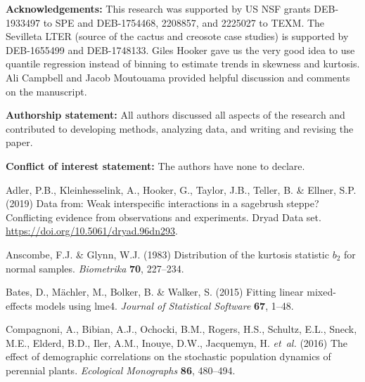 \documentclass[12pt]{article}
\begin{document}
\begin{spacing}{1.9}
\bigskip 
\noindent\textbf{Acknowledgements:} This research was supported by US NSF grants DEB-1933497 to SPE and DEB-1754468, 2208857, and 2225027 to TEXM. The Sevilleta LTER (source of the cactus and creosote case studies) is supported by DEB-1655499 and DEB-1748133. Giles Hooker gave us the very good idea to use quantile regression instead of binning to estimate trends in skewness and kurtosis. Ali Campbell and Jacob Moutouama provided helpful discussion and comments on the manuscript. 

\bigskip 
\noindent\textbf{Authorship statement:} All authors discussed all aspects of the research and contributed to developing methods, analyzing data, and writing and revising the paper.  

\bigskip 
\noindent\textbf{Conflict of interest statement:} The authors have none to declare. 

%
%

\begin{thebibliography}{62}
\providecommand{\natexlab}[1]{#1}

Adler, P.B., Kleinhesselink, A., Hooker, G., Taylor, J.B., Teller, B. \&
  Ellner, S.P. (2019) Data from: Weak interspecific interactions in a sagebrush
  steppe? {C}onflicting evidence from observations and experiments. {D}ryad
  {D}ata set. \url{https://doi.org/10.5061/dryad.96dn293}.

Anscombe, F.J. \& Glynn, W.J. (1983) Distribution of the kurtosis statistic
  $b_2$ for normal samples. \emph{Biometrika} \textbf{70}, 227--234.

Bates, D., M{\"a}chler, M., Bolker, B. \& Walker, S. (2015) Fitting linear
  mixed-effects models using {lme4}. \emph{Journal of Statistical Software}
  \textbf{67}, 1--48.

Compagnoni, A., Bibian, A.J., Ochocki, B.M., Rogers, H.S., Schultz, E.L.,
  Sneck, M.E., Elderd, B.D., Iler, A.M., Inouye, D.W., Jacquemyn, H.
  \emph{et~al.} (2016) The effect of demographic correlations on the stochastic
  population dynamics of perennial plants. \emph{Ecological Monographs}
  \textbf{86}, 480--494.


\end{thebibliography}
\end{spacing}
\end{document}
